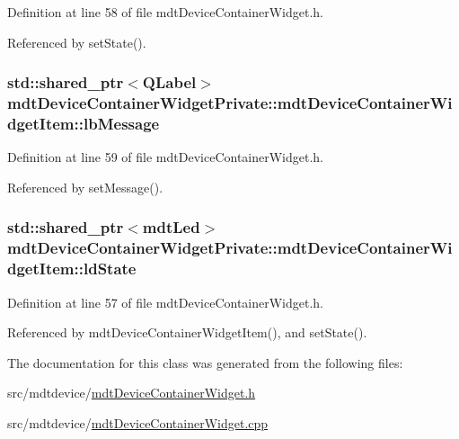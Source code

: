 Definition at line 58 of file mdt\-Device\-Container\-Widget.\-h.



Referenced by set\-State().

\hypertarget{classmdt_device_container_widget_private_1_1mdt_device_container_widget_item_af2dffac7204f93f210794c6800f54b28}{
\subsubsection[{lb\-Message}]{\setlength{\rightskip}{0pt plus 5cm}std\-::shared\-\_\-ptr$<$Q\-Label$>$ mdt\-Device\-Container\-Widget\-Private\-::mdt\-Device\-Container\-Widget\-Item\-::lb\-Message}}\label{classmdt_device_container_widget_private_1_1mdt_device_container_widget_item_af2dffac7204f93f210794c6800f54b28}


Definition at line 59 of file mdt\-Device\-Container\-Widget.\-h.



Referenced by set\-Message().

\hypertarget{classmdt_device_container_widget_private_1_1mdt_device_container_widget_item_affa159e1f4c9b4392e2339ae067d2f0f}{
\subsubsection[{ld\-State}]{\setlength{\rightskip}{0pt plus 5cm}std\-::shared\-\_\-ptr$<${\bf mdt\-Led}$>$ mdt\-Device\-Container\-Widget\-Private\-::mdt\-Device\-Container\-Widget\-Item\-::ld\-State}}\label{classmdt_device_container_widget_private_1_1mdt_device_container_widget_item_affa159e1f4c9b4392e2339ae067d2f0f}


Definition at line 57 of file mdt\-Device\-Container\-Widget.\-h.



Referenced by mdt\-Device\-Container\-Widget\-Item(), and set\-State().



The documentation for this class was generated from the following files\-:\begin{DoxyCompactItemize}
\item 
src/mdtdevice/\hyperlink{mdt_device_container_widget_8h}{mdt\-Device\-Container\-Widget.\-h}\item 
src/mdtdevice/\hyperlink{mdt_device_container_widget_8cpp}{mdt\-Device\-Container\-Widget.\-cpp}\end{DoxyCompactItemize}
